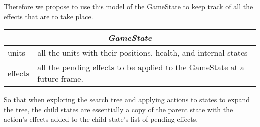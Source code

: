 Therefore we propose to use this model of the GameState to keep track of all the effects that are to take place.

\begin{center}
\begin{tabular}{ | l | p{} | }
\hline
\multicolumn{2}{|c|}{\emph{GameState}} \\
\hline
units		& all the units with their positions, health, and internal states \\
effects	& all the pending effects to be applied to the GameState at a future frame. \\
\hline
\end{tabular}
\end{center}

So that when exploring the search tree and applying actions to states to expand the tree, the child states are essentially a copy of the parent state with the action's effects added to the child state's list of pending effects.
